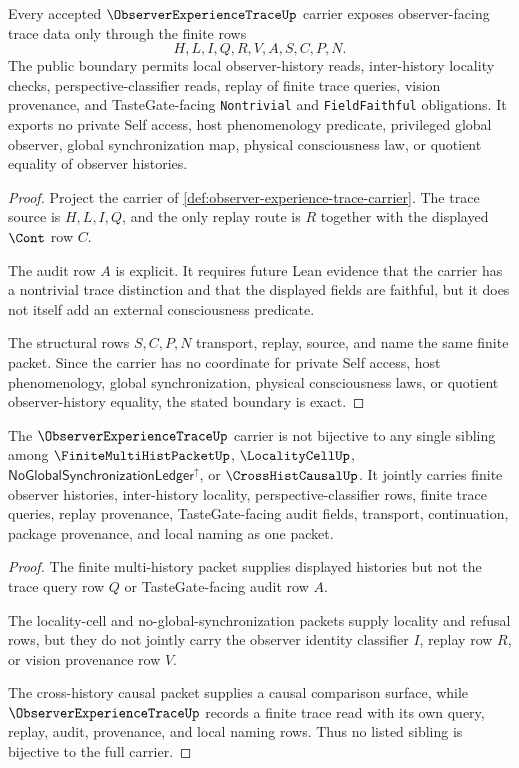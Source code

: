 \begin{theorem}
\label{thm:observer-experience-trace-boundary}
Every accepted $\ObserverExperienceTraceUp$ carrier exposes observer-facing trace data only through the finite rows
$$
H,L,I,Q,R,V,A,S,C,P,N.
$$
The public boundary permits local observer-history reads, inter-history locality checks, perspective-classifier reads, replay of finite trace queries, vision provenance, and TasteGate-facing \texttt{Nontrivial} and \texttt{FieldFaithful} obligations. It exports no private Self access, host phenomenology predicate, privileged global observer, global synchronization map, physical consciousness law, or quotient equality of observer histories.
\end{theorem}
\begin{proof}
Project the carrier of \autoref{def:observer-experience-trace-carrier}. The trace source is $H,L,I,Q$, and the only replay route is $R$ together with the displayed $\Cont$ row $C$.

The audit row $A$ is explicit. It requires future Lean evidence that the carrier has a nontrivial trace distinction and that the displayed fields are faithful, but it does not itself add an external consciousness predicate.

The structural rows $S,C,P,N$ transport, replay, source, and name the same finite packet. Since the carrier has no coordinate for private Self access, host phenomenology, global synchronization, physical consciousness laws, or quotient observer-history equality, the stated boundary is exact.
\end{proof}

\begin{theorem}
\label{thm:observer-experience-trace-independence}
The $\ObserverExperienceTraceUp$ carrier is not bijective to any single sibling among $\FiniteMultiHistPacketUp$, $\LocalityCellUp$, $\mathsf{NoGlobalSynchronizationLedger}^{\uparrow}$, or $\CrossHistCausalUp$. It jointly carries finite observer histories, inter-history locality, perspective-classifier rows, finite trace queries, replay provenance, TasteGate-facing audit fields, transport, continuation, package provenance, and local naming as one packet.
\end{theorem}
\begin{proof}
The finite multi-history packet supplies displayed histories but not the trace query row $Q$ or TasteGate-facing audit row $A$.

The locality-cell and no-global-synchronization packets supply locality and refusal rows, but they do not jointly carry the observer identity classifier $I$, replay row $R$, or vision provenance row $V$.

The cross-history causal packet supplies a causal comparison surface, while $\ObserverExperienceTraceUp$ records a finite trace read with its own query, replay, audit, provenance, and local naming rows. Thus no listed sibling is bijective to the full carrier.
\end{proof}

